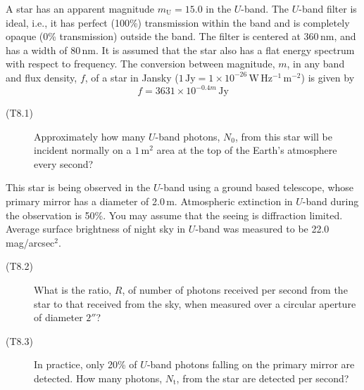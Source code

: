 A star has an apparent magnitude $m_{\mathrm{U}} = 15.0$ in the $U$-band. The
$U$-band filter is ideal, i.e., it has perfect (100\%) transmission within the
band and is completely opaque (0\% transmission) outside the band. The filter
is centered at 360\,nm, and has a width of 80\,nm. It is assumed that the star
also has a flat energy spectrum with respect to frequency. The conversion
between magnitude, $m$, in any band and flux density, $f$, of a star in Jansky
($1\,\mathrm{Jy} = 1 \times 10^{-26}\,\mathrm{W\,Hz^{-1}\,m^{-2}}$) is given by
\[ f = 3631 \times 10^{-0.4 m}\,\mathrm{Jy} \]

\begin{description}
\item[(T8.1)] Approximately how many $U$-band photons, $N_0$, from this star
  will be incident normally on a $1\,\mathrm{m}^2$ area at the top of the
  Earth's atmosphere every second?
\end{description}

This star is being observed in the $U$-band using a ground based telescope,
whose primary mirror has a diameter of 2.0\,m. Atmospheric extinction in
$U$-band during the observation is 50\%. You may assume that the seeing is
diffraction limited. Average surface brightness of night sky in $U$-band was
measured to be 22.0\,mag/arcsec$^2$.

\begin{description}
\item[(T8.2)] What is the ratio, $R$, of number of photons received per second
  from the star to that received from the sky, when measured over a circular
  aperture of diameter $2''$?
\item[(T8.3)] In practice, only 20\% of $U$-band photons falling on the primary
  mirror are detected. How many photons, $N_{\mathrm{t}}$, from the star are
  detected per second?
\end{description}
